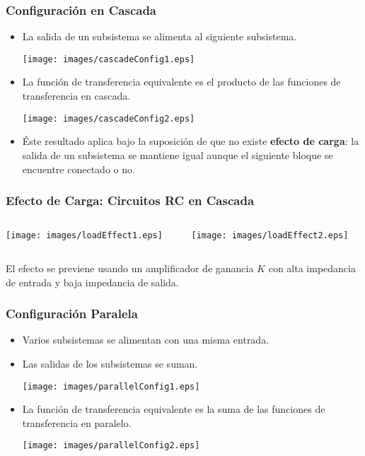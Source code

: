 \documentclass[aspectratio=169,handout]{beamer}
\theoremstyle{definition}
\theoremstyle{plain}
\theoremstyle{remark}
\begin{document}
\begin{frame}[<+->]\frametitle{Configuración en Cascada}
\begin{itemize}
	\item La salida de un subsistema se alimenta al siguiente subsistema.
	\begin{center}
		\texttt{[image: images/cascadeConfig1.eps]}
	\end{center}
	\item La función de transferencia equivalente es el producto de las funciones de transferencia en cascada.
	\begin{center}
		\texttt{[image: images/cascadeConfig2.eps]}
	\end{center}
	\item Éste resultado aplica bajo la suposición de que no existe \textbf{efecto de carga}: la salida de un subsistema se mantiene igual aunque el siguiente bloque se encuentre conectado o no.
\end{itemize}
\end{frame}

\begin{frame}[<+->]\frametitle{Efecto de Carga: Circuitos RC en Cascada}
\begin{columns}
	\begin{column}{0.5\textwidth}
		\centering
		\texttt{[image: images/loadEffect1.eps]}
	\end{column}
	\pause
	\begin{column}{0.5\textwidth}
		\centering
		\texttt{[image: images/loadEffect2.eps]}
	\end{column}	
\end{columns}
	\small	
	El efecto se previene usando un amplificador de ganancia $K$ con alta impedancia de entrada y baja impedancia de salida.
\end{frame}

\begin{frame}[<+->]\frametitle{Configuración Paralela}
	\begin{itemize}
		\item Varios subsistemas se alimentan con una misma entrada.
		\item Las salidas de los subsistemas se suman.
		\begin{center}
			\texttt{[image: images/parallelConfig1.eps]}
		\end{center}
		\item La función de transferencia equivalente es la suma de las funciones de transferencia en paralelo.
		\begin{center}
			\texttt{[image: images/parallelConfig2.eps]}
		\end{center}
	\end{itemize}
\end{frame}
\end{document}
